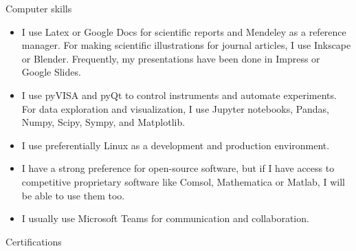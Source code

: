 \documentclass[letterpaper, 11pt]{article}[leftmargin=*]
\renewcommand{\section}[2]{
  \colorbox{boxcol}{\color{secondary}\raggedbottom\normalsize{#1}{\hspace{2pt}#2}}
}
\newcommand{\resumeItemListStart}{\begin{itemize}[leftmargin=4.5mm]\itemsep-3pt}
\newcommand{\resumeItemListEnd}{\end{itemize}}
\newcommand{\resumeItem}[1]{
  \item\small{
    {#1}
  }
}
\begin{document}
\section{\faDesktop}{Computer skills}
\resumeItemListStart
\resumeItem{\footnotesize I use Latex or Google Docs for scientific reports and Mendeley as a reference manager. For making scientific illustrations for journal articles, I use Inkscape or Blender. Frequently, my presentations have been done in Impress or Google Slides.}
\resumeItem{\footnotesize I use pyVISA and pyQt to control instruments and automate experiments. For data exploration and visualization, I use Jupyter notebooks, Pandas, Numpy, Scipy, Sympy, and Matplotlib.}
\resumeItem{\footnotesize I use preferentially Linux as a development and production environment.}
\resumeItem{\footnotesize I have a strong preference for open-source software, but if I have access to competitive proprietary software like Comsol, Mathematica or Matlab, I will be able to use them too.}
\resumeItem{\footnotesize I usually use Microsoft Teams for communication and collaboration.}
\resumeItemListEnd

\section{\faCertificate}{Certifications}
\end{document}
